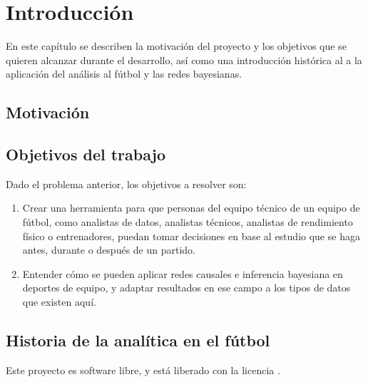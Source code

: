 \chapter{Introducción}

En este capítulo se describen la motivación del proyecto y los objetivos que
se quieren alcanzar durante el desarrollo, así como una introducción histórica al
a la aplicación del análisis al fútbol y las redes bayesianas. 

\section{Motivación}


\section{Objetivos del trabajo} \label{sect:goals}

Dado el problema anterior, los objetivos a resolver son:

\begin{enumerate}
    \item \label{obj:1} Crear una herramienta para que personas del equipo técnico de
    un equipo de fútbol, como analistas de datos, analistas técnicos, analistas de rendimiento 
    físico o entrenadores, puedan tomar decisiones en base al estudio que se haga antes, durante 
    o después de un partido. 
    \item \label{obj:2} Entender cómo se pueden aplicar redes causales e inferencia 
    bayesiana en deportes de equipo, y adaptar resultados en ese campo a 
    los tipos de datos que existen aquí.
\end{enumerate}

\section{Historia de la analítica en el fútbol}


Este proyecto es software libre, y está liberado con la licencia \cite{gplv3}.
